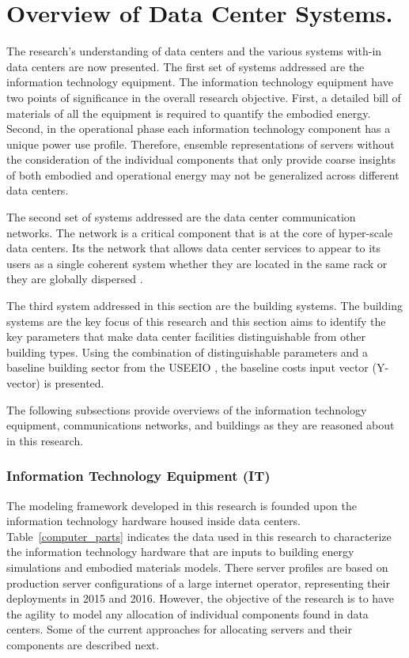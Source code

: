 \section{Overview of Data Center Systems.}
    The research's understanding of data centers and the various systems with-in data centers are now presented. The first set of systems addressed are the information technology equipment. The information technology equipment have two points of significance in the overall research objective. First, a detailed bill of materials of all the equipment is required to quantify the embodied energy. Second, in the operational phase each information technology component has a unique power use profile. Therefore, ensemble representations of servers without the consideration of the individual components that only provide coarse insights of both embodied and operational energy may not be generalized across different data centers. 
    
    The second set of systems addressed are the data center communication networks. The network is a critical component that is at the core of hyper-scale data centers. Its the network that allows data center services to appear to its users as a single coherent system whether they are located in the same rack or they are globally dispersed \cite{steen17}.
    
    The third system addressed in this section are the building systems. The building systems are the key focus of this research and this section aims to identify the key parameters that make data center facilities distinguishable from other building types. Using the combination of distinguishable parameters and a baseline building sector from the USEEIO \cite{yang17}, the baseline costs input vector (Y-vector) is presented.
    
    The following subsections provide overviews of the information technology equipment, communications networks, and buildings as they are reasoned about in this research.
    
        \subsubsection{Information Technology Equipment (IT)}
            The modeling framework developed in this research is founded upon the information technology hardware housed inside data centers. Table~\ref{computer_parts} indicates the data used in this research to characterize the information technology hardware that are inputs to building energy simulations and embodied materials models. There server profiles are based on production server configurations of a large internet operator, representing their deployments in 2015 and 2016. However, the objective of the research is to have the agility to model any allocation of individual components found in data centers. Some of the current approaches for allocating servers and their components are described next.
            
